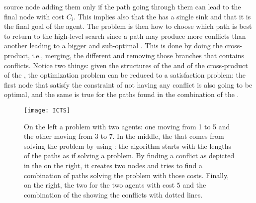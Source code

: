 source node adding them only if the path going through them can lead to the
final node with cost $C_i$. This implies also that the  has a single
sink and that it is the final goal of the agent. \newline
The problem is then how to choose which path is best to return to the
high-level search since a path may produce more conflicts than another leading
to a bigger and sub-optimal . This is done by doing the
cross-product, i.e., merging, the different  and removing those
branches that contains conflicts. 
Notice two things: given the structures of the  and of the 
cross-product of the , the optimization problem can be reduced to a
satisfaction problem: the first  node that satisfy the constraint of
not having any conflict is also going to be optimal, and the same is true for
the paths found in the combination of the .
\begin{figure}[tb]
  \centering
  \texttt{[image: ICTS]}
  \caption{On the left a  problem with two agents: one moving from 1
  to 5 and the other moving from 3 to 7. In the middle, the  that
  comes from solving the problem by using : the algorithm starts
  with the lengths of the paths as if solving a  problem. By finding
  a conflict as depicted in the  on the right, it creates two nodes
  and tries to find a combination of paths solving the problem with those
  costs. Finally, on the right, the two  for the two agents with
  cost $5$ and the combination of the  showing the conflicts with
  dotted lines.}
  \label{fig:ICTS}
\end{figure}
%

